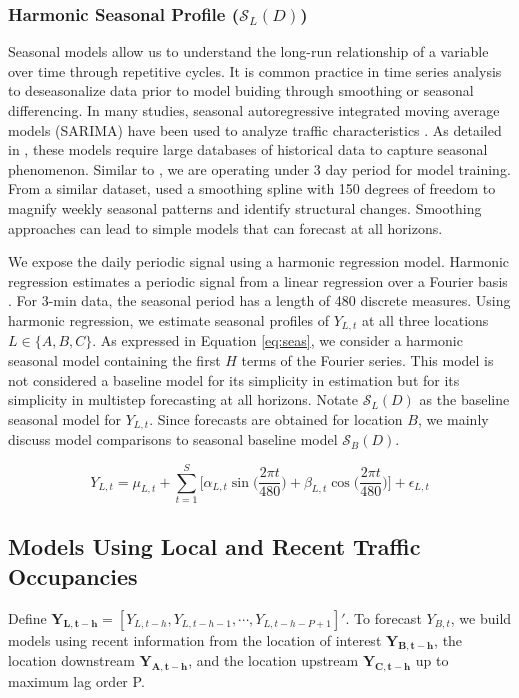 \subsubsection{Harmonic Seasonal Profile ($\mathcal{S}_L(D)$)}
Seasonal models allow us to understand the long-run relationship of a variable over time through repetitive cycles. It is common practice in time series analysis to deseasonalize data prior to model buiding through smoothing or seasonal differencing. In many studies, seasonal autoregressive integrated moving average models (SARIMA) have been used to analyze traffic characteristics \citep{Williams2003, Ghosh2005, Zhang2011}. As detailed in \cite{Kumar2015}, these models require large databases of historical data to capture seasonal phenomenon. Similar to \cite{Kumar2015}, we are operating under 3 day period for model training. From a similar dataset, \cite{Kamarianakis2010} used a smoothing spline with 150 degrees of freedom to magnify weekly seasonal patterns and identify structural changes. Smoothing approaches can lead to simple models that can forecast at all horizons.

We expose the daily periodic signal using a harmonic regression model. Harmonic regression estimates a periodic signal from a linear regression over a Fourier basis \citep{Metcalfe2009}. For 3-min data, the seasonal period has a length of 480 discrete measures. Using harmonic regression, we estimate seasonal profiles of $Y_{L,t}$ at all three locations $L \in \{A,B,C\}$.  As expressed in Equation \ref{eq:seas}, we consider a harmonic seasonal model containing the first $H$ terms of the Fourier series.  This model is not considered a baseline model for its simplicity in estimation but for its simplicity in multistep forecasting at all horizons. Notate $\mathcal{S}_L(D)$ as the baseline seasonal model for $Y_{L,t}$. Since forecasts are obtained for location $B$, we mainly discuss model comparisons to seasonal baseline model $\mathcal{S}_B(D)$.

\begin{equation}
\label{eq:seas}
Y_{L,t}=\mu_{L,t}+\sum\limits_{t=1}^{S} \Big[\alpha_{L,t}\sin\Big(\frac{2\pi t}{480}\Big)+\beta_{L,t}\cos\Big(\frac{2\pi t}{480}\Big)\Big]+\epsilon_{L,t}
\end{equation}

\subsection{Models Using Local and Recent Traffic Occupancies}
Define $\bm{Y_{L,t-h}}=[Y_{L,t-h},Y_{L,t-h-1},\cdots,Y_{L,t-h-P+1}]'$. To forecast $Y_{B,t}$, we build models using recent information from the location of interest  $\bm{Y_{B,t-h}}$, the location downstream $\bm{Y_{A,t-h}}$, and the location upstream $\bm{Y_{C,t-h}}$ up to maximum lag order P. 


